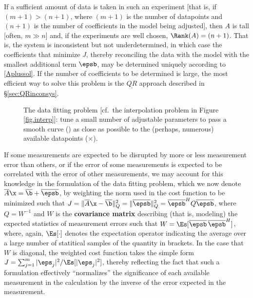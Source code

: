 If a sufficient amount of data is taken in such an experiment
[that is, if $(m+1)>(n+1)$, where $(m+1)$ is the number of datapoints and $(n+1)$ is the number of coefficients in the
model being adjusted], then $A$ is tall [often, $m\gg n$] and, if the experiments are
well chosen, $\Rank(A)=(n+1)$.  That is, the system is inconsistent but
not underdetermined, in which case the coefficients that minimize $J$,
thereby reconciling the data with the model with the smallest
additional term $\epsb$, may be determined uniquely according to
\eqref{Aplussol}.  If the number of coefficients to be determined is
large, the most efficient way to solve this problem is the
$\underline{QR}$ approach described in \S \ref{sec:QRinconsys}.

\begin{figure}[t!]
\centerline{}

\caption{The data fitting problem [cf.~the interpolation problem in Figure \ref{fig.interp}]: tune a small number of
adjustable parameters to pass a smooth curve (\solid\!) as close as possible to
the (perhaps, numerous) available datapoints ($\times$).}\label{fig.fit}
\end{figure}


\noindent If some measurements are expected to be disrupted by more or less
measurement error than others, or if the error of some measurements is
expected to be correlated with the error of other measurements, we may
account for this knowledge in the formulation of the data fitting
problem, which we now denote
$\overline{A}\x=\overline{\b}+\overline{\epsb}$, by weighting the norm
used in the cost function to be minimized such that $J=\Vert
\overline{A}\x - \overline{\b} \Vert^{2}_{Q} = \Vert \overline{\epsb}
\Vert^{2}_{Q}=\overline{\epsb}^{H} Q \overline{\epsb}$, where
$Q=W^{-1}$ and $W$ is the {\bf covariance matrix} describing (that is,
modeling) the expected statistics of measurement errors such that
$W=\Es[\overline{\epsb} \, \overline{\epsb}^{H}]$, where, again, $\Es[\cdot]$
denotes the expectation operator indicating the average over a
large number of statitical samples of the quantity in brackets.  In
the case that $W$ is diagonal, the weighted cost function takes the
simple form $J=\sum_{j=1}^{m} |\eps_{j}|^{2}/\Es[|\eps_{j}|^{2}]$,
thereby reflecting the fact that such a formulation effectively
``normalizes'' the significance of each available measurement in the
calculation by the inverse of the error expected in the measurement.

